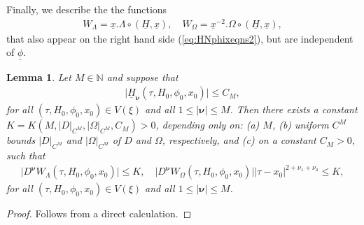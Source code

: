 \documentclass[reqno,12pt]{amsart}
\newcommand{\eqlab}[1]{\label{eq:#1}}
\renewcommand{\eqref}[1]{(\ref{eq:#1})}
\newcommand{\lemmaref}[1]{Lemma~\ref{lemma:#1}}
\newcommand{\lemmalab}[1]{\label{lemma:#1}}
\newtheorem{lemma}[theorem]{Lemma}
\numberwithin{equation}{section}
\begin{document}
% 


Finally, we describe the
the functions
\begin{align*}
 W_\Lambda=\underline x .\Lambda \circ (\underline H,\underline x),\quad W_\Omega =\underline x^{-2}. \Omega\circ (\underline H,\underline x),
\end{align*}
that also appear on the right hand side \eqref{HNphixeqns2}, but are independent of $\underline \phi$.
\begin{lemma}\lemmalab{est2}
 Let $M\in \mathbb N$ and suppose that
 \begin{align*}
  \vert \underline H_{\mathbf \nu}(\tau,H_0,\phi_0,x_0)\vert \le C_M,
 \end{align*}
for all $(\tau,H_0,\phi_0,x_0)\in V(\xi)$ and all $1\le \vert \mathbf \nu\vert\le M$. 
Then there exists a constant $K=K(M,\vert D\vert_{C^M},\vert \Omega\vert_{C^M},C_M)>0$, depending only on: (a) $M$, (b) uniform $C^M$ bounds $\vert D\vert_{C^M}$ and $\vert \Omega \vert_{C^M}$ of $D$ and $\Omega$, respectively, and (c) on a constant $C_M>0$, such that
\begin{align*}
\vert D^{\mathbf \nu}W_\Lambda(\tau,H_0,\phi_0,x_0)\vert\le K,\quad  \vert D^{\mathbf \nu}W_\Omega(\tau,H_0,\phi_0,x_0)\vert\vert \tau-x_0\vert^{2+\nu_1+\nu_4} \le K,
\end{align*}
for all $(\tau,H_0,\phi_0,x_0)\in V(\xi)$ and all $1\le \vert \mathbf \nu\vert\le M$.
\end{lemma}
\begin{proof}
 Follows from a direct calculation.
\end{proof}
\end{document}
